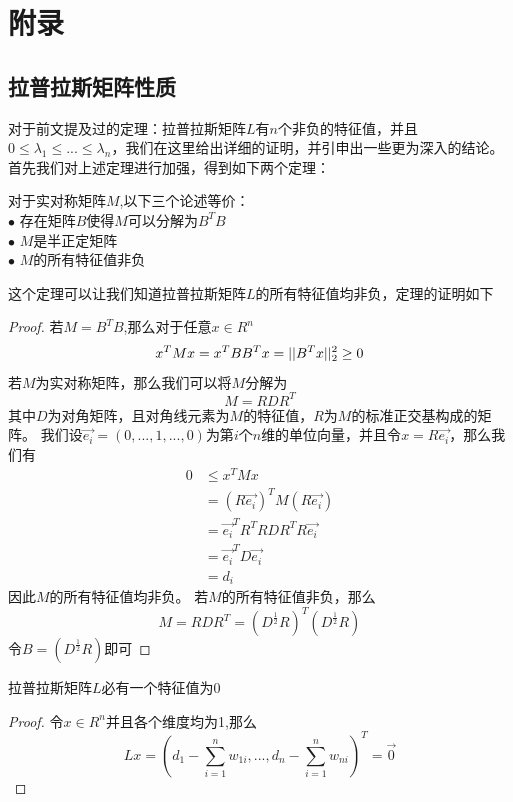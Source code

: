 \documentclass[11pt]{scrartcl}
\begin{document}
\section{附录}
\subsection{拉普拉斯矩阵性质}
对于前文提及过的定理：拉普拉斯矩阵$L$有$n$个非负的特征值，并且$0\le \lambda_1\le...\le\lambda_n$，我们在这里给出详细的证明，并引申出一些更为深入的结论。首先我们对上述定理进行加强，得到如下两个定理：
\begin{theorem}
对于实对称矩阵$M$,以下三个论述等价：\\
$\bullet$ 存在矩阵$B$使得$M$可以分解为$B^TB$\\
$\bullet$ $M$是半正定矩阵\\
$\bullet$ $M$的所有特征值非负
\end{theorem}
这个定理可以让我们知道拉普拉斯矩阵$L$的所有特征值均非负，定理的证明如下

\begin{proof}
若$M=B^TB$,那么对于任意$x\in R^n$
$$
x^T M x=x^T BB^Tx=||B^Tx||^2_2\ge0\\
$$
若$M$为实对称矩阵，那么我们可以将$M$分解为
$$
M=RDR^T
$$
其中$D$为对角矩阵，且对角线元素为$M$的特征值，$R$为$M$的标准正交基构成的矩阵。
我们设$\vec{e_i}=(0,...,1,...,0)$为第$i$个$n$维的单位向量，并且令$x=R\vec{e_i}$，那么我们有
\begin{equation}
\begin{aligned}
0&\le x^T Mx\\
&=(R\vec{e_i})^TM(R\vec{e_i})\\
&=\vec{e_i}^T R^TRDR^T R \vec{e_i}\\
&=\vec{e_i}^T D \vec{e_i}\\ 
&=d_i
\end{aligned}
\end{equation}
因此$M$的所有特征值均非负。
若$M$的所有特征值非负，那么
$$
M=RDR^T=(D^\frac{1}{2}R)^T(D^\frac{1}{2}R)
$$
令$B=(D^\frac{1}{2}R)$即可

\end{proof}


\begin{theorem}
拉普拉斯矩阵$L$必有一个特征值为0
\end{theorem}

\begin{proof}
令$x\in R^n$并且各个维度均为1,那么
$$
Lx=(d_1-\sum_{i=1}^n w_{1i},...,d_n-\sum_{i=1}^n w_{ni})^T=\vec{0}
$$
\end{proof}
\end{document}
